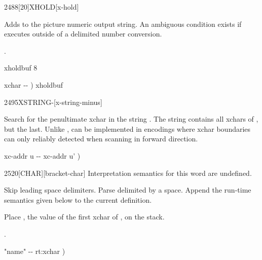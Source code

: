 \vspace*{-2ex}
\begin{worddef}{2488}[20]{XHOLD}[x-hold]%
\item {}

	Adds  to the picture numeric output string.  An ambiguous
	condition exists if  executes outside of a 
	 delimited number conversion.

\see {}.

	\begin{implement} %
	 xholdbuf 8 

	\word{:}   xchar -{}- )
		xholdbuf    \word{-}  \word{;}
	\end{implement}
\end{worddef}

\vspace*{-2ex}
\begin{worddef}[XSTRING-]{2495}{X\bs{}STRING-}[x-string-minus]%
\item {}

	Search for the penultimate xchar in the string .
	The string  contains all xchars of
	, but the last.  Unlike ,
	 can be implemented in encodings where xchar
	boundaries can only reliably detected when scanning in forward
	direction.

	\begin{implement} %
	\word{:}   xc-addr u -{}- xc-addr u' ) \\
	\tab {} \word{+}   \word{-} \word{;}
	\end{implement}
\end{worddef}

\vspace*{-3ex}
\enlargethispage{6ex}
\begin{worddef}{2520}{[CHAR]}[bracket-char]%
\interpret
	Interpretation semantics for this word are undefined.

\compile {}

	Skip leading space delimiters.  Parse  delimited by a space.
	Append the run-time semantics given below to the current definition.

\runtime {}

	Place , the value of the first xchar of , on
	the stack.

\see {}.

	\begin{implement} %
	\word{:} \word{[CHAR]}  "name" -{}- rt:xchar ) \\
	\tab {}   \word{;} 
	\end{implement}
\end{worddef}

\endinput
